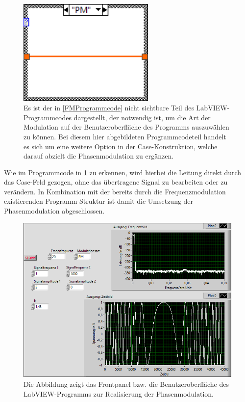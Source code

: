 \documentclass[
a4paper,
12pt,
pagesize,
ngerman
]{scrartcl}
\begin{document}
	\begin{figure}[H]
		\centering
		\includegraphics[width=0.6\textwidth]{EIRE2018Dateien/Tag4/FMPM-Erzeugung/PM-FMPM-Erzeugungd1}
		\caption{Es ist der in \cref{FMProgrammcode} nicht sichtbare Teil des LabVIEW-Programmcodes dargestellt, der notwendig ist, um die Art der Modulation auf der Benutzeroberfläche des Programms auszuwählen zu können. Bei diesem hier abgebildeten Programmcodeteil handelt es sich um eine weitere Option in der Case-Konstruktion, welche darauf abzielt die Phasenmodulation zu ergänzen.}
		\label{PMProgrammcode}
	\end{figure}
	
	\noindent Wie im Programmcode in \cref{PMProgrammcode} zu erkennen, wird hierbei die Leitung direkt durch das Case-Feld gezogen, ohne das übertragene Signal zu bearbeiten oder zu verändern. 
	In Kombination mit der bereits durch die Frequenzmodulation existierenden Programm-Struktur ist damit die Umsetzung der Phasenmodulation abgeschlossen. 
	
	\begin{figure}[H]
		\centering
		\includegraphics[width=1.0\textwidth]{EIRE2018Dateien/Tag4/FMPM-Erzeugung/PM-FMPM-Erzeugungp}
		\caption{Die Abbildung zeigt das Frontpanel bzw. die Benutzeroberfläche des LabVIEW-Programms zur Realisierung der Phasenmodulation.}
		\label{PMAusgabe}
	\end{figure}
	
\end{document}
